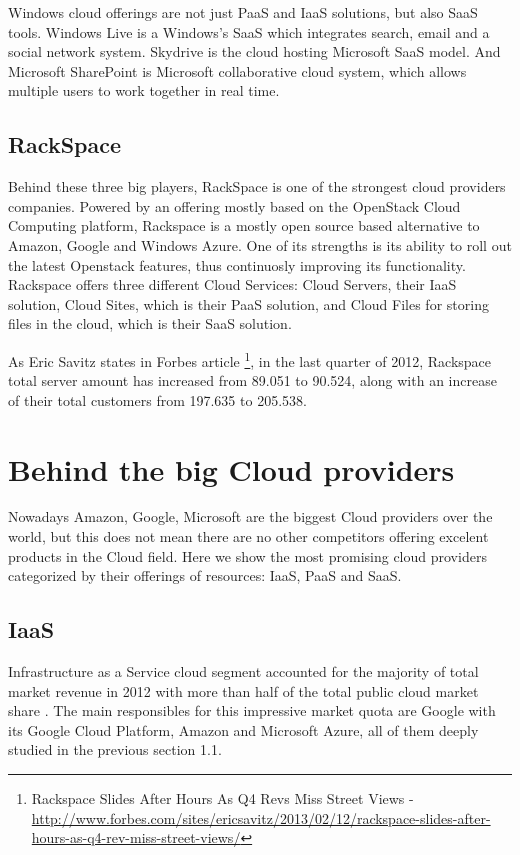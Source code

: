 Windows cloud offerings are not just PaaS and IaaS solutions, but also SaaS tools. Windows Live is a Windows's SaaS which integrates search, email and a social network system. Skydrive is the cloud hosting Microsoft SaaS model. And Microsoft SharePoint is Microsoft collaborative cloud system, which allows multiple users to work together in real time.


\subsection{RackSpace}

Behind these three big players, RackSpace \cite{RackSpace} is one of the strongest cloud providers companies. Powered by an offering mostly based on the OpenStack Cloud Computing platform, Rackspace is a mostly open source based alternative to Amazon, Google and Windows Azure. One of its strengths is its ability to roll out the latest Openstack features, thus continuosly improving its functionality. Rackspace offers three different Cloud Services: Cloud Servers, their IaaS solution, Cloud Sites, which is their PaaS solution, and Cloud Files for storing files in the cloud, which is their SaaS solution. 
\par
As Eric Savitz states in Forbes article \footnote{Rackspace {S}lides {A}fter {H}ours {A}s {Q}4 {R}evs {M}iss {S}treet {V}iews - \url{http://www.forbes.com/sites/ericsavitz/2013/02/12/rackspace-slides-after-hours-as-q4-rev-miss-street-views/}}, in the last quarter of 2012, Rackspace total server amount has increased from 89.051 to 90.524, along with an increase of their total customers from 197.635 to 205.538.

\section{Behind the big Cloud providers}

Nowadays Amazon, Google, Microsoft are the biggest Cloud providers over the world, but this does not mean there are no other competitors offering excelent products in the Cloud field. Here we show the most promising cloud providers categorized by their offerings of resources: IaaS, PaaS and SaaS.

\subsection{IaaS}

Infrastructure as a Service cloud segment accounted for the majority of total market revenue in 2012 with more than half of the total public cloud market share \cite{aslett2013451}. The main responsibles for this impressive market quota are Google with its Google Cloud Platform, Amazon and Microsoft Azure, all of them deeply studied in the previous section 1.1. 


